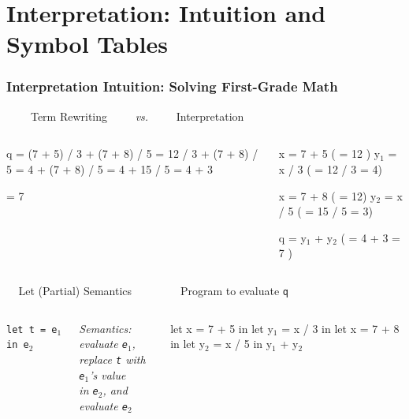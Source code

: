 \documentclass{beamer}
\renewcommand{\emph}[1]{\textcolor{structure}{#1}}
\newcommand{\mymath}[1]{$ #1 $}
\newcommand{\myindx}[1]{_{#1}}
\begin{document}
\section{Interpretation: Intuition and Symbol Tables}

\begin{frame}[fragile]
	\tableofcontents[currentsection]
\end{frame}

\begin{frame}[fragile,t]
   \frametitle{Interpretation Intuition: Solving First-Grade Math}

\begin{block}{$~~~~~~~~~~$Term Rewriting $~~~~~~~~~~${\em vs.}$~~~~~~~~~~$ Interpretation}
\begin{columns}
\begin{colorcode}[fontsize=\scriptsize]
q = (7 + 5) / 3 + (7 + 8) / 5
  = 12 / 3      + (7 + 8) / 5
  = 4           + (7 + 8) / 5
  = 4           + 15 / 5
  = 4           + 3

  = 7
\end{colorcode} 
\begin{colorcode}[fontsize=\scriptsize]
x  = 7 + 5     ( = 12 )
y\mymath{\myindx{1}} = x / 3     ( = 12 / 3 = 4)

x  = 7 + 8     ( = 12)
y\mymath{\myindx{2}} = x / 5     ( = 15 / 5 = 3)

q  = y\mymath{\myindx{1}} + y\mymath{\myindx{2}}   ( = 4 + 3 = 7 ) 
\end{colorcode}
\end{columns}
\end{block}

\pause

\begin{block}{$~~~~~$Let (Partial) Semantics $~~~~~~~~~~~~~~~~~$ Program to evaluate {\tt q}}
\begin{columns}
{\tt let t = e$_1$ in e$_2$} 

\smallskip

{\em \emph{Semantics:} evaluate {\tt e$_1$},}\\
{\em replace {\tt t} with {\tt e$_1$}'s value}\\
{\em in {\tt e$_2$}, and evaluate {\tt e$_2$}}
\begin{colorcode}[fontsize=\small]
let x = 7 + 5
in  let y\mymath{\myindx{1}} = x / 3
    in  let x = 7 + 8
        in  let y\mymath{\myindx{2}} = x / 5
            in  y\mymath{\myindx{1}} + y\mymath{\myindx{2}}
\end{colorcode}
\end{columns}
\end{block}


\end{frame}
\end{document}
